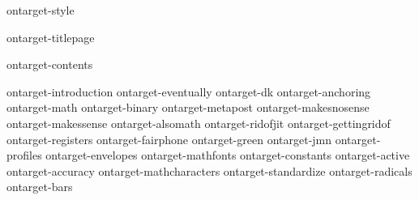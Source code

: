 
\environment ontarget-style

\dontcomplain

\startdocument

    \component ontarget-titlepage

    \startfrontmatter
        \component ontarget-contents
    \stopfrontmatter

    \startbodymatter
        \component ontarget-introduction
        \component ontarget-eventually
        \component ontarget-dk
        \component ontarget-anchoring
        \component ontarget-math
        \component ontarget-binary
        \component ontarget-metapost
        \component ontarget-makesnosense
        \component ontarget-makessense
        \component ontarget-alsomath
        \component ontarget-ridofjit
        \component ontarget-gettingridof
        \component ontarget-registers
        \component ontarget-fairphone
        \component ontarget-green
        \component ontarget-jmn
        \component ontarget-profiles
        \component ontarget-envelopes
        \component ontarget-mathfonts
        \component ontarget-constants
        \component ontarget-active
        \component ontarget-accuracy
        \component ontarget-mathcharacters
        \component ontarget-standardize
        \component ontarget-radicals
        \component ontarget-bars
    \stopbodymatter

\stopdocument

